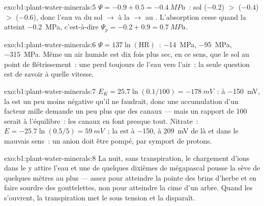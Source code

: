 \begin{solution}{exo:b1:plant-water-minerals:5}
 $\Psi = -0.9 + 0.5 = \qty{-0.4}{MPa}$~: sol ($-0.2$) $>$ 
($-0.4$) $>$  ($-0.6$), donc l'eau va du sol $\to$ à la 
$\to$ au . L'absorption cesse quand la  atteint
\qty{-0.2}{MPa}, c'est-à-dire $\Psi_p = -0.2 + 0.9 = \qty{0.7}{MPa}$.
\end{solution}

\begin{solution}{exo:b1:plant-water-minerals:6}
$\Psi = 137\ln(\text{HR})$~: \qty{-14}{MPa}, \qty{-95}{MPa},
\qty{-315}{MPa}. Même un air humide est dix fois plus sec, en ce sens,
que le sol au point de flétrissement~: une  perd toujours de
l'eau vers l'air~; la seule question est de savoir à quelle vitesse.
\end{solution}

\begin{solution}{exo:b1:plant-water-minerals:7}
$E_K = 25.7\ln(0.1/100) = \qty{-178}{mV}$~: à \qty{-150}{mV}, la 
est un peu moins négative qu'il ne faudrait, donc une accumulation d'un
facteur mille demande un peu plus que des canaux --- mais un rapport de
100 serait à l'équilibre~: les canaux en font presque tout. Nitrate~:
$E = -25.7\ln(0.5/5)
= \qty{+59}{mV}$~; la  est à \qty{-150}{}, à \qty{209}{mV} de là
et dans le mauvais sens~: un anion doit être pompé, par symport de
protons.
\end{solution}

\begin{solution}{exo:b1:plant-water-minerals:8}
La nuit, sans transpiration, le chargement d'ions dans le  y
attire l'eau et une  de quelques dixièmes de
mégapascal pousse la sève de quelques mètres au plus --- assez pour
atteindre la pointe des brins d'herbe et en faire sourdre des
gouttelettes, non pour atteindre la cime d'un arbre. Quand les
 s'ouvrent, la transpiration met le  sous tension et la
 disparaît.
\end{solution}

